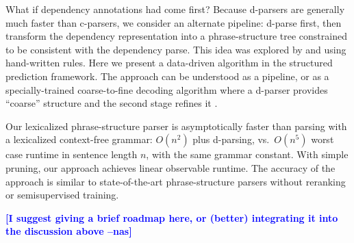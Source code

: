 \documentclass[11pt,letterpaper]{article}
\newcommand{\lpkcomment}[1]{\textcolor{red}{\bf \small [#1 --lpk]}}
\newcommand{\nascomment}[1]{\textcolor{blue}{\bf \small [#1 --nas]}}
\begin{document}
What if dependency annotations had come first?  Because d-parsers are
generally much faster than c-parsers, we consider an alternate
pipeline: d-parse first, then transform the dependency representation
into a phrase-structure tree constrained to be consistent with the
dependency parse.  This idea was explored by   and
 using hand-written rules.  Here we present a data-driven
algorithm in the structured prediction framework.  The approach can be
understood as a pipeline, or as a specially-trained coarse-to-fine
decoding algorithm where a d-parser provides ``coarse'' structure and
the second stage refines it \cite{??}.

Our lexicalized phrase-structure parser is
asymptotically faster than
  parsing with a lexicalized context-free grammar:  $O(n^2)$ plus
  d-parsing,
  vs.~$O(n^5)$ worst case runtime in sentence length $n$, with the same grammar constant.
   With simple pruning, our approach achieves
  linear observable runtime.  The accuracy of the approach is similar
  to state-of-the-art phrase-structure parsers without reranking or
  semisupervised training.


\nascomment{I suggest giving a brief roadmap here, or (better) integrating it
  into the discussion above}




\end{document}
